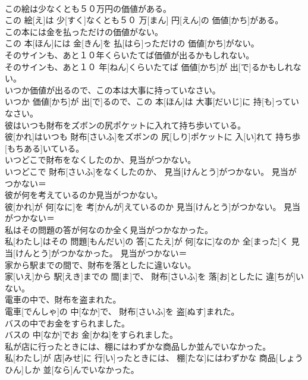 \documentclass[8pt]{extreport}
\begin{document}
\begin{CJK}{UTF8}{min}
\\	この絵は少なくとも５０万円の価値がある。	
\\	この 絵[え]は 少[すく]なくとも５０ 万[まん] 円[えん]の 価値[かち]がある。	
\\	この本には金を払っただけの価値がない。	
\\	この 本[ほん]には 金[きん]を 払[はら]っただけの 価値[かち]がない。	
\\	そのサインも、あと１０年くらいたてば価値が出るかもしれない。	
\\	そのサインも、あと１０ 年[ねん]くらいたてば 価値[かち]が 出[で]るかもしれない。	
\\	いつか価値が出るので、この本は大事に持っていなさい。	
\\	いつか 価値[かち]が 出[で]るので、この 本[ほん]は 大事[だいじ]に 持[も]っていなさい。	
\\	彼はいつも財布をズボンの尻ポケットに入れて持ち歩いている。	
\\	彼[かれ]はいつも 財布[さいふ]をズボンの 尻[しり]ポケットに 入[い]れて 持ち歩[もちある]いている。	
\\	いつどこで財布をなくしたのか、見当がつかない。	
\\	いつどこで 財布[さいふ]をなくしたのか、 見当[けんとう]がつかない。	見当がつかない＝ 
\\	彼が何を考えているのか見当がつかない。	
\\	彼[かれ]が 何[なに]を 考[かんが]えているのか 見当[けんとう]がつかない。	見当がつかない＝ 
\\	私はその問題の答が何なのか全く見当がつかなかった。	
\\	私[わたし]はその 問題[もんだい]の 答[こたえ]が 何[なに]なのか 全[まった]く 見当[けんとう]がつかなかった。	見当がつかない＝ 
\\	家から駅までの間で、財布を落としたに違いない。	
\\	家[いえ]から 駅[えき]までの 間[ま]で、 財布[さいふ]を 落[お]としたに 違[ちが]いない。	
\\	電車の中で、財布を盗まれた。	
\\	電車[でんしゃ]の 中[なか]で、 財布[さいふ]を 盗[ぬす]まれた。	
\\	バスの中でお金をすられました。	
\\	バスの 中[なか]でお 金[かね]をすられました。	
\\	私が店に行ったときには、棚にはわずかな商品しか並んでいなかった。	
\\	私[わたし]が 店[みせ]に 行[い]ったときには、 棚[たな]にはわずかな 商品[しょうひん]しか 並[なら]んでいなかった。	

\end{CJK}
\end{document}
